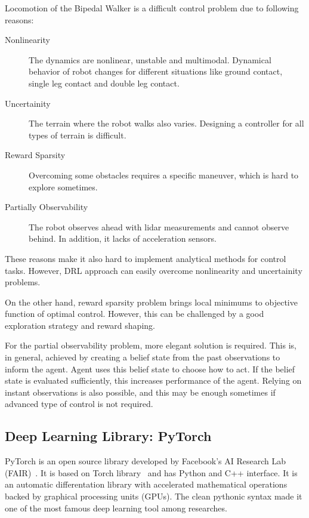 Locomotion of the Bipedal Walker is a difficult control problem due to following reasons: 
\begin{description}
	\item[Nonlinearity] The dynamics are nonlinear, unstable and multimodal. 
	Dynamical behavior of robot changes for different situations 
	like ground contact, single leg contact and double leg contact.
	\item[Uncertainity] The terrain where the robot walks also varies. 
	Designing a controller for all types of terrain is difficult.
	\item[Reward Sparsity] Overcoming some obstacles requires a specific maneuver, which is hard to explore sometimes.	
	\item[Partially Observability] The robot observes 
	ahead with lidar measurements and cannot observe behind. 
	In addition, it lacks of acceleration sensors.
\end{description}

These reasons make it also hard to implement analytical methods for control tasks. 
However, DRL approach can easily overcome nonlinearity and uncertainity problems.

On the other hand, reward sparsity problem brings local minimums to objective function of optimal control. However, this can be challenged by a good exploration strategy and reward shaping. 

For the partial observability problem, more elegant solution is required. 
This is, in general, achieved by creating a belief state from the past observations to inform the agent. 
Agent uses this belief state to choose how to act. 
If the belief state is evaluated sufficiently, 
this increases performance of the agent.
Relying on instant observations is also possible, 
and this may be enough sometimes if advanced type of control is not required. 

\subsection{Deep Learning Library: PyTorch}
\label{dl_pytorch}
PyTorch is an open source library developed by Facebook's AI Research Lab (FAIR)~\cite{paszke_pytorch_2019}. 
It is based on Torch library~\cite{collobert_torch7_2011} and has Python and C++ interface. 
It is an automatic differentation library with accelerated mathematical operations backed by graphical processing units (GPUs). 
The clean pythonic syntax made it one of the most famous deep learning tool among researches. 
